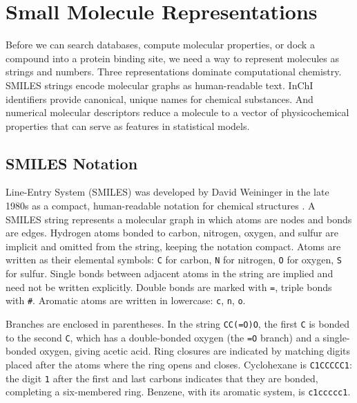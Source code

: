 \section{Small Molecule Representations}
\label{sec:mol-representations}

Before we can search databases, compute molecular properties, or dock a compound into a protein binding site, we need a way to represent molecules as strings and numbers. Three representations dominate computational chemistry. SMILES strings encode molecular graphs as human-readable text. InChI identifiers provide canonical, unique names for chemical substances. And numerical molecular descriptors reduce a molecule to a vector of physicochemical properties that can serve as features in statistical models.


\subsection{SMILES Notation}
\label{sec:smiles}

 Line-Entry System (SMILES) was developed by David Weininger in the late 1980s as a compact, human-readable notation for chemical structures \cite{weininger1988}. A SMILES string represents a molecular graph in which atoms are nodes and bonds are edges. Hydrogen atoms bonded to carbon, nitrogen, oxygen, and sulfur are implicit and omitted from the string, keeping the notation compact. Atoms are written as their elemental symbols: \texttt{C} for carbon, \texttt{N} for nitrogen, \texttt{O} for oxygen, \texttt{S} for sulfur. Single bonds between adjacent atoms in the string are implied and need not be written explicitly. Double bonds are marked with \texttt{=}, triple bonds with \texttt{\#}. Aromatic atoms are written in lowercase: \texttt{c}, \texttt{n}, \texttt{o}.

Branches are enclosed in parentheses. In the string \texttt{CC(=O)O}, the first \texttt{C} is bonded to the second \texttt{C}, which has a double-bonded oxygen (the \texttt{=O} branch) and a single-bonded oxygen, giving acetic acid. Ring closures are indicated by matching digits placed after the atoms where the ring opens and closes. Cyclohexane is \texttt{C1CCCCC1}: the digit \texttt{1} after the first and last carbons indicates that they are bonded, completing a six-membered ring. Benzene, with its aromatic system, is \texttt{c1ccccc1}.

